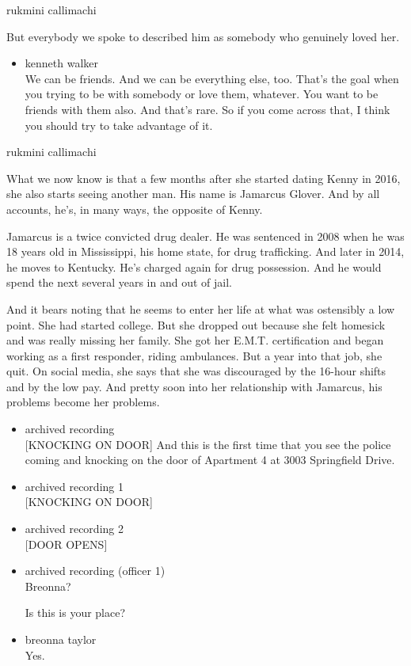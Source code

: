 rukmini callimachi

But everybody we spoke to described him as somebody who genuinely loved
her.

\begin{itemize}
\tightlist
\item
  kenneth walker\\
  We can be friends. And we can be everything else, too. That's the goal
  when you trying to be with somebody or love them, whatever. You want
  to be friends with them also. And that's rare. So if you come across
  that, I think you should try to take advantage of it.
\end{itemize}

rukmini callimachi

What we now know is that a few months after she started dating Kenny in
2016, she also starts seeing another man. His name is Jamarcus Glover.
And by all accounts, he's, in many ways, the opposite of Kenny.

Jamarcus is a twice convicted drug dealer. He was sentenced in 2008 when
he was 18 years old in Mississippi, his home state, for drug
trafficking. And later in 2014, he moves to Kentucky. He's charged again
for drug possession. And he would spend the next several years in and
out of jail.

And it bears noting that he seems to enter her life at what was
ostensibly a low point. She had started college. But she dropped out
because she felt homesick and was really missing her family. She got her
E.M.T. certification and began working as a first responder, riding
ambulances. But a year into that job, she quit. On social media, she
says that she was discouraged by the 16-hour shifts and by the low pay.
And pretty soon into her relationship with Jamarcus, his problems become
her problems.

\begin{itemize}
\item
  archived recording\\
  {[}KNOCKING ON DOOR{]} And this is the first time that you see the
  police coming and knocking on the door of Apartment 4 at 3003
  Springfield Drive.
\item
  archived recording 1\\
  {[}KNOCKING ON DOOR{]}
\item
  archived recording 2\\
  {[}DOOR OPENS{]}
\item
  archived recording (officer 1)\\
  Breonna?

  Is this is your place?
\item
  breonna taylor\\
  Yes.
\end{itemize}

